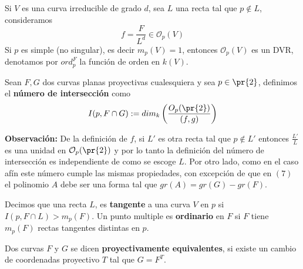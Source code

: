 \documentclass{article}
\begin{document}
\vspace{2mm}
\noindent Si $V$ es una curva irreducible de grado $d$, sea $L$ una recta tal que $p\not\in L$, 
consideramos
\begin{equation*}
    f=\frac{F}{L^{d}}\in \mathcal{O}_{p}(V)
\end{equation*}
Si $p$ es simple (no singular), es decir $m_{p}(V)=1$, entonces $\mathcal{O}_{p}(V)$ es un DVR, 
denotamos por $ord_{p}^{F}$ la función de orden en $k(V)$.
\begin{dfn}
    Sean $F,G$ dos curvas planas proyectivas cualesquiera y sea $p\in\pr{2}$, definimos el 
    \textbf{número de intersección} como
    \begin{equation*}
        I(p,F\cap G):=dim_{k}\left(\frac{O_{p}(\pr{2})}{(f,g)}\right)
    \end{equation*}
\end{dfn}
\noindent\textbf{Observación:} De la definición de $f$, si $L'$ es otra recta tal que $p\not\in L'$
entonces $\frac{L'}{L}$ es una unidad en $\mathcal{O}_{p}(\pr{2})$ y por lo tanto la definición del
número de intersección es independiente de como se escoge $L$. Por otro lado, como en el caso afín
este número cumple las mismas propiedades, con excepción de que en $(7)$ el polinomio $A$ debe ser
una forma tal que $gr(A)=gr(G)-gr(F)$.
\begin{dfn}
    Decimos que una recta $L$, es \textbf{tangente} a una curva $V$ en $p$ si $I(p,F\cap L)
    >m_{p}(F)$. Un punto multiple es \textbf{ordinario} en $F$ si $F$ tiene $m_{p}(F)$ rectas 
    tangentes distintas en $p$.
\end{dfn}
\begin{dfn}
    Dos curvas $F$ y $G$ se dicen \textbf{proyectivamente equivalentes}, si existe un cambio de 
    coordenadas proyectivo $T$ tal que $G=F^{T}$.
\end{dfn}

\end{document}
